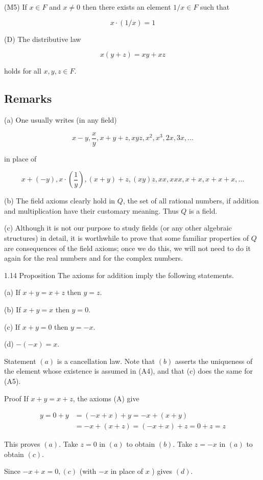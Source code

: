 \documentclass[10pt]{article}
\begin{document}
(M5) If $x \in F$ and $x \neq 0$ then there exists an element $1 / x \in F$ such that

$$
x \cdot(1 / x)=1
$$

(D) The distributive law

$$
x(y+z)=x y+x z
$$

holds for all $x, y, z \in F$.

\subsection{Remarks}
(a) One usually writes (in any field)

$$
x-y, \frac{x}{y}, x+y+z, x y z, x^{2}, x^{3}, 2 x, 3 x, \ldots
$$

in place of

$$
x+(-y), x \cdot\left(\frac{1}{y}\right),(x+y)+z,(x y) z, x x, x x x, x+x, x+x+x, \ldots
$$

(b) The field axioms clearly hold in $Q$, the set of all rational numbers, if addition and multiplication have their customary meaning. Thus $Q$ is a field.

(c) Although it is not our purpose to study fields (or any other algebraic structures) in detail, it is worthwhile to prove that some familiar properties of $Q$ are consequences of the field axioms; once we do this, we will not need to do it again for the real numbers and for the complex numbers.

1.14 Proposition The axioms for addition imply the following statements.

(a) If $x+y=x+z$ then $y=z$.

(b) If $x+y=x$ then $y=0$.

(c) If $x+y=0$ then $y=-x$.

(d) $-(-x)=x$.

Statement $(a)$ is a cancellation law. Note that $(b)$ asserts the uniqueness of the element whose existence is assumed in (A4), and that (c) does the same for (A5).

Proof If $x+y=x+z$, the axioms (A) give

$$
\begin{aligned}
y=0+y & =(-x+x)+y=-x+(x+y) \\
& =-x+(x+z)=(-x+x)+z=0+z=z
\end{aligned}
$$

This proves $(a)$. Take $z=0$ in $(a)$ to obtain $(b)$. Take $z=-x$ in $(a)$ to obtain $(c)$.

Since $-x+x=0,(c)$ (with $-x$ in place of $x$ ) gives $(d)$.
\end{document}
